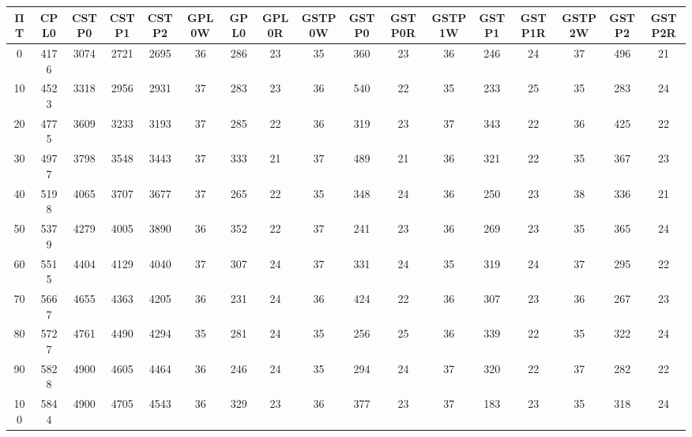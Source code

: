 \begin{tabular}{|c|c|c|c|c|c|c|c|c|c|c|c|c|c|c|c|c|}
\hline
ΠΤ&CPL0&CSTP0&CSTP1&CSTP2&GPL0W&GPL0&GPL0R&GSTP0W&GSTP0&GSTP0R&GSTP1W&GSTP1&GSTP1R&GSTP2W&GSTP2&GSTP2R\\\hline
\hline
0&4176&3074&2721&2695&36&286&23&35&360&23&36&246&24&37&496&21\\
\hline
10&4523&3318&2956&2931&37&283&23&36&540&22&35&233&25&35&283&24\\
\hline
20&4775&3609&3233&3193&37&285&22&36&319&23&37&343&22&36&425&22\\
\hline
30&4977&3798&3548&3443&37&333&21&37&489&21&36&321&22&35&367&23\\
\hline
40&5198&4065&3707&3677&37&265&22&35&348&24&36&250&23&38&336&21\\
\hline
50&5379&4279&4005&3890&36&352&22&37&241&23&36&269&23&35&365&24\\
\hline
60&5515&4404&4129&4040&37&307&24&37&331&24&35&319&24&37&295&22\\
\hline
70&5667&4655&4363&4205&36&231&24&36&424&22&36&307&23&36&267&23\\
\hline
80&5727&4761&4490&4294&35&281&24&35&256&25&36&339&22&35&322&24\\
\hline
90&5828&4900&4605&4464&36&246&24&35&294&24&37&320&22&37&282&22\\
\hline
100&5844&4900&4705&4543&36&329&23&36&377&23&37&183&23&35&318&24\\
\hline
\end{tabular}
